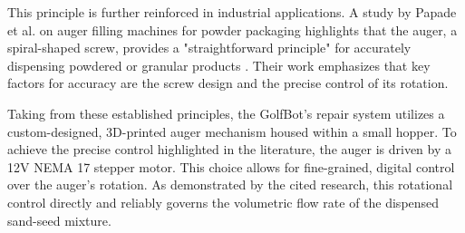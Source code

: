 This principle is further reinforced in industrial applications. A study by Papade et al. on auger filling machines for powder packaging highlights that the auger, a spiral-shaped screw, provides a "straightforward principle" for accurately dispensing powdered or granular products \cite{papade2024dosing}. Their work emphasizes that key factors for accuracy are the screw design and the precise control of its rotation.

Taking from these established principles, the GolfBot's repair system utilizes a custom-designed, 3D-printed auger mechanism housed within a small hopper. To achieve the precise control highlighted in the literature, the auger is driven by a 12V NEMA 17 stepper motor. This choice allows for fine-grained, digital control over the auger's rotation. As demonstrated by the cited research, this rotational control directly and reliably governs the volumetric flow rate of the dispensed sand-seed mixture.



